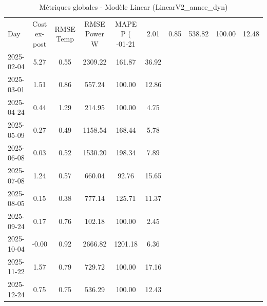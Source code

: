 \begin{table}
\caption{Métriques globales - Modèle Linear (LinearV2_annee_dyn)}
\label{tab:Linear_LinearV2_annee_dyn_Validation_EPlus_sans_Opti}
\begin{small}
\begin{tabular}{lccccc}
\toprule
Day & Cost ex-post & RMSE Temp & RMSE Power W & MAPE P (%
-01-21 & 2.01 & 0.85 & 538.82 & 100.00 & 12.48 \\
2025-02-04 & 5.27 & 0.55 & 2309.22 & 161.87 & 36.92 \\
2025-03-01 & 1.51 & 0.86 & 557.24 & 100.00 & 12.86 \\
2025-04-24 & 0.44 & 1.29 & 214.95 & 100.00 & 4.75 \\
2025-05-09 & 0.27 & 0.49 & 1158.54 & 168.44 & 5.78 \\
2025-06-08 & 0.03 & 0.52 & 1530.20 & 198.34 & 7.89 \\
2025-07-08 & 1.24 & 0.57 & 660.04 & 92.76 & 15.65 \\
2025-08-05 & 0.15 & 0.38 & 777.14 & 125.71 & 11.37 \\
2025-09-24 & 0.17 & 0.76 & 102.18 & 100.00 & 2.45 \\
2025-10-04 & -0.00 & 0.92 & 2666.82 & 1201.18 & 6.36 \\
2025-11-22 & 1.57 & 0.79 & 729.72 & 100.00 & 17.16 \\
2025-12-24 & 0.75 & 0.75 & 536.29 & 100.00 & 12.43 \\
\bottomrule
\end{tabular}
\end{small}
\end{table}
